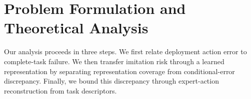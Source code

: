 \section{Problem Formulation and Theoretical Analysis}
\label{sec:analysis}
Our analysis proceeds in three steps.
We first relate deployment action error to complete-task failure.
We then transfer imitation risk through a learned representation by separating representation coverage from conditional-error discrepancy.
Finally, we bound this discrepancy through expert-action reconstruction from task descriptors.




